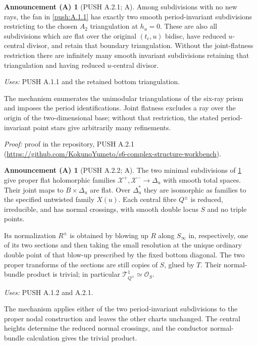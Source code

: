 \documentclass[11pt,a4paper]{article}
\theoremstyle{plain}
\theoremstyle{definition}
\newtheorem{announcement}[theorem]{Announcement (A)}
\begin{document}
\begin{announcement}[PUSH A.2.1; A]\label{push:A.2.1}
Among subdivisions with no new rays, the fan in \ref{push:A.1.1} has exactly
two smooth period-invariant subdivisions restricting to the chosen
$A_2$ triangulation at $h_u=0$. These are also all subdivisions
which are flat over the original $(t_c,u)$ bidisc, have reduced
$u$-central divisor, and retain that boundary triangulation.
Without the joint-flatness restriction there are infinitely many
smooth invariant subdivisions retaining that triangulation and
having reduced $u$-central divisor.
\end{announcement}
\noindent\emph{Uses:} PUSH A.1.1 and the retained bottom triangulation.\par

The mechanism enumerates the unimodular triangulations of the six-ray prism and imposes the period identifications. Joint flatness excludes a ray over the origin of the two-dimensional base; without that restriction, the stated period-invariant point stars give arbitrarily many refinements.

\noindent\emph{Proof:} proof in the repository, PUSH A.2.1 (\url{https://github.com/KokunoYumeto/s6-complex-structure-workbench}).

\begin{announcement}[PUSH A.2.2; A]\label{push:A.2.2}
The two minimal subdivisions of \ref{push:A.2.1} give proper flat holomorphic
families $\mathcal X^+,\mathcal X^-\to\Delta_u$ with smooth total
spaces. Their joint maps to $B\times\Delta_u$ are flat. Over
$\Delta_u^*$ they are isomorphic as families to the specified
untwisted family $X(u)$. Each central fibre $Q^\pm$ is reduced,
irreducible, and has normal crossings, with smooth double locus
$S$ and no triple points.

Its normalization $R^\pm$ is obtained by blowing up $R$ along
$S_\infty$ in, respectively, one of its two sections and then
taking the small resolution at the unique ordinary double point
of that blow-up prescribed by the fixed bottom diagonal.
The two proper transforms of the sections are still copies of
$S$, glued by $T$. Their normal-bundle product is trivial;
in particular $\mathcal T^1_{Q^\pm}\simeq\mathcal O_S$.
\end{announcement}
\noindent\emph{Uses:} PUSH A.1.2 and A.2.1.\par

The mechanism applies either of the two period-invariant subdivisions to the proper nodal construction and leaves the other charts unchanged. The central heights determine the reduced normal crossings, and the conductor normal-bundle calculation gives the trivial product.
\end{document}
